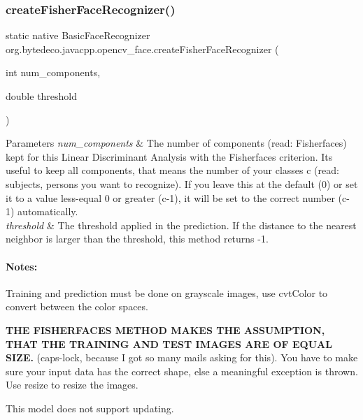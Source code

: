 \subsubsection{\texorpdfstring{create\+Fisher\+Face\+Recognizer()}{createFisherFaceRecognizer()}}
{\footnotesize\ttfamily static native Basic\+Face\+Recognizer org.\+bytedeco.\+javacpp.\+opencv\+\_\+face.\+create\+Fisher\+Face\+Recognizer (\begin{DoxyParamCaption}\item[{int}]{num\+\_\+components,  }\item[{double}]{threshold }\end{DoxyParamCaption})\hspace{0.3cm}{\ttfamily [static]}}


\begin{DoxyParams}{Parameters}
{\em num\+\_\+components} & The number of components (read\+: Fisherfaces) kept for this Linear Discriminant Analysis with the Fisherfaces criterion. It\textquotesingle{}s useful to keep all components, that means the number of your classes c (read\+: subjects, persons you want to recognize). If you leave this at the default (0) or set it to a value less-\/equal 0 or greater (c-\/1), it will be set to the correct number (c-\/1) automatically. \\
\hline
{\em threshold} & The threshold applied in the prediction. If the distance to the nearest neighbor is larger than the threshold, this method returns -\/1. \\
\hline
\end{DoxyParams}
\paragraph*{Notes\+:}


\begin{DoxyItemize}
\item Training and prediction must be done on grayscale images, use cvt\+Color to convert between the color spaces.
\item {\bfseries T\+HE F\+I\+S\+H\+E\+R\+F\+A\+C\+ES M\+E\+T\+H\+OD M\+A\+K\+ES T\+HE A\+S\+S\+U\+M\+P\+T\+I\+ON, T\+H\+AT T\+HE T\+R\+A\+I\+N\+I\+NG A\+ND T\+E\+ST I\+M\+A\+G\+ES A\+RE OF E\+Q\+U\+AL S\+I\+ZE.} (caps-\/lock, because I got so many mails asking for this). You have to make sure your input data has the correct shape, else a meaningful exception is thrown. Use resize to resize the images.
\item This model does not support updating. 
\end{DoxyItemize}


